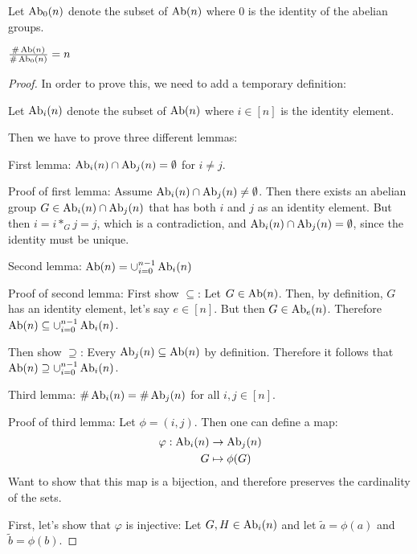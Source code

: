\begin{definition}
    Let \( \operatorname{Ab}_0(n) \) denote the subset of \( \operatorname{Ab}(n) \) where \( 0 \) is the identity of the abelian groups.
\end{definition}

\begin{theorem}
    \( \frac{\#\operatorname{Ab}(n)}{\#\operatorname{Ab}_0(n)} = n \)
\end{theorem}
\begin{proof}
    In order to prove this, we need to add a temporary definition:

    Let \( \operatorname{Ab}_i(n) \) denote the subset of \( \operatorname{Ab}(n) \) where \( i \in [n] \) is the identity element.

    Then we have to prove three different lemmas:

    First lemma: \( \operatorname{Ab}_i(n) \cap \operatorname{Ab}_j(n) = \emptyset \) for \( i \neq j \).

    Proof of first lemma: Assume \( \operatorname{Ab}_i(n) \cap \operatorname{Ab}_j(n) \neq \emptyset \). Then there exists an abelian group \( G \in \operatorname{Ab}_i(n) \cap \operatorname{Ab}_j(n) \) that has both \( i \) and \( j \) as an identity element. But then \( i = i *_G j = j \), which is a contradiction, and \( \operatorname{Ab}_i(n) \cap \operatorname{Ab}_j(n) = \emptyset \), since the identity must be unique.

    Second lemma: \( \operatorname{Ab}(n) = \cup_{i=0}^{n-1} \operatorname{Ab}_i(n) \)

    Proof of second lemma: First show \( \subseteq \): Let \( G \in \operatorname{Ab}(n) \). Then, by definition, \( G \) has an identity element, let's say \( e \in [n] \). But then \( G \in \operatorname{Ab}_e(n) \). Therefore \( \operatorname{Ab}(n) \subseteq \cup_{i=0}^{n-1} \operatorname{Ab}_i(n) \).

    Then show \( \supseteq \): Every \( \operatorname{Ab}_j(n) \subseteq \operatorname{Ab}(n) \) by definition. Therefore it follows that \( \operatorname{Ab}(n) \supseteq \cup_{i=0}^{n-1} \operatorname{Ab}_i(n) \).

    Third lemma: \( \#\operatorname{Ab}_i(n) = \#\operatorname{Ab}_j(n) \) for all \( i, j \in [n] \).

    Proof of third lemma: Let \( \phi = (i, j) \). Then one can define a map:
    \begin{align*}
        \varphi: \operatorname{Ab}_i(n) &\to \operatorname{Ab}_j(n) \\
        G &\mapsto \phi(G)
    \end{align*}
    Want to show that this map is a bijection, and therefore preserves the cardinality of the sets.

    First, let's show that \( \varphi \) is injective: Let \( G, H \in \operatorname{Ab}_i(n) \) and let \( \tilde{a} = \phi(a) \) and \( \tilde{b} = \phi(b) \).


\end{proof}
